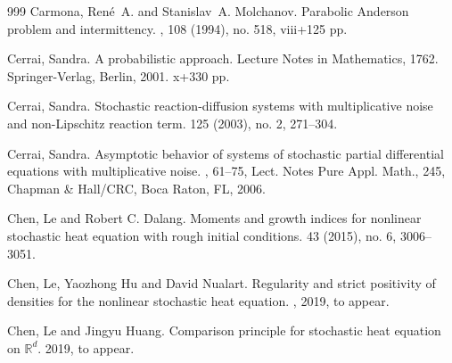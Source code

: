 \documentclass[a4paper,11pt]{article}
\theoremstyle{plain}
\theoremstyle{definition}
\newcommand{\R}{\mathbb{R}}
\numberwithin{NQ}{section}
\numberwithin{LQ}{section}
\numberwithin{ZQ}{section}
\begin{document}
\begin{small}
\begin{thebibliography}{999}
Carmona, Ren\'e~A.  and Stanislav~A. Molchanov.
\newblock Parabolic Anderson problem and intermittency.
, 108 (1994), no. 518, viii+125 pp. 
%


Cerrai, Sandra.
\newblock A probabilistic approach. Lecture Notes in Mathematics, 1762. Springer-Verlag, Berlin, 2001. x+330 pp. 

Cerrai, Sandra.
\newblock Stochastic reaction-diffusion systems with multiplicative noise and non-Lipschitz reaction term.
 125 (2003), no. 2, 271--304. 

Cerrai, Sandra.
\newblock Asymptotic behavior of systems of stochastic partial differential equations with multiplicative noise. 
, 61--75, 
Lect. Notes Pure Appl. Math., 245, Chapman \& Hall/CRC, Boca Raton, FL, 2006. 

Chen, Le and Robert C. Dalang.
\newblock Moments and growth indices for nonlinear stochastic heat equation
  with rough initial conditions.
  43 (2015), no. 6, 3006--3051.



Chen, Le, Yaozhong Hu and David Nualart.
\newblock Regularity and strict positivity of densities for the nonlinear stochastic heat equation.
, 2019, to appear. 

Chen, Le and Jingyu Huang.
\newblock Comparison principle for stochastic heat equation on $\R^d$.
  2019, to appear.




\end{thebibliography}
\end{small}
\end{document}
